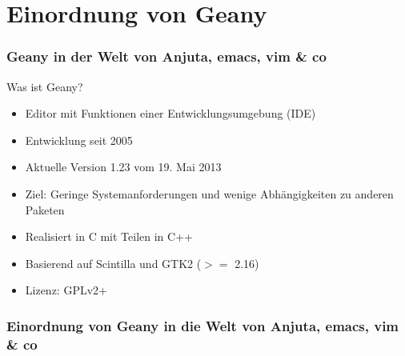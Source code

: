 \section[Einordnung]{Einordnung von Geany}
\begin{frame}
	\frametitle{Geany in der Welt von Anjuta, emacs, vim \& co}
	\begin{block}{Was ist Geany?}
		\begin{itemize}
			\item Editor mit Funktionen einer Entwicklungsumgebung (IDE)
			\item Entwicklung seit 2005
			\item Aktuelle Version 1.23 vom 19. Mai 2013
			\item Ziel: Geringe Systemanforderungen und wenige
				  Abhängigkeiten zu anderen Paketen
			\item Realisiert in C mit Teilen in C++
			\item Basierend auf Scintilla und GTK2 ($>=$ 2.16)
			\item Lizenz: GPLv2+
		\end{itemize}
	\end{block}
\end{frame}

\begin{frame}
	\frametitle{Einordnung von Geany in die Welt von Anjuta, emacs, vim \& co}
	\begin{figure}[ht]
		\centering
 		\footnotesize
		
	\end{figure}
\end{frame}
